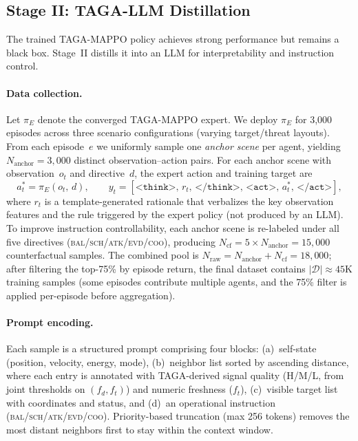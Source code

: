 \subsection{Stage II: TAGA-LLM Distillation}
\label{sec:distill}

The trained TAGA-MAPPO policy achieves strong performance but remains a black
box.  Stage~II distills it into an LLM for interpretability and instruction
control.

\paragraph{Data collection.}
Let $\pi_E$ denote the converged TAGA-MAPPO expert.  We deploy $\pi_E$ for
3{,}000 episodes across three scenario configurations (varying target/threat
layouts).  From each episode~$e$ we uniformly sample one \emph{anchor scene}
per agent, yielding $N_{\text{anchor}} \!=\! 3{,}000$ distinct
observation--action pairs.  For each anchor scene with observation~$o_t$ and
directive~$d$, the expert action and training target are
\begin{equation}
  a_t^{*} = \pi_E(o_t,\, d),\qquad
  y_t = [\texttt{<think>},\, r_t,\, \texttt{</think>},\,
         \texttt{<act>},\, a_t^{*},\, \texttt{</act>}],
  \label{eq:teacher}
\end{equation}
where $r_t$ is a template-generated rationale that verbalizes the key
observation features and the rule triggered by the expert policy (not produced
by an LLM).  To improve instruction controllability, each anchor scene is
re-labeled under all five directives
(\textsc{bal}/\textsc{sch}/\textsc{atk}/\textsc{evd}/\textsc{coo}), producing
$N_{\text{cf}} = 5 \times N_{\text{anchor}} = 15{,}000$ counterfactual
samples.  The combined pool is
$N_{\text{raw}} = N_{\text{anchor}} + N_{\text{cf}} = 18{,}000$; after
filtering the top-75\% by episode return, the final dataset contains
$|\mathcal{D}| \approx 45$K training samples (some episodes contribute
multiple agents, and the 75\% filter is applied per-episode before
aggregation).

\paragraph{Prompt encoding.}
Each sample is a structured prompt comprising four blocks: (a)~self-state
(position, velocity, energy, mode), (b)~neighbor list sorted by ascending
distance, where each entry is annotated with TAGA-derived signal quality
(H/M/L, from joint thresholds on $(f_d, f_t)$) and numeric freshness ($f_t$),
(c)~visible target list with
coordinates and status, and (d)~an operational instruction
(\textsc{bal}/\textsc{sch}/\textsc{atk}/\textsc{evd}/\textsc{coo}).
Priority-based truncation (max 256 tokens) removes the most distant neighbors
first to stay within the context window.

